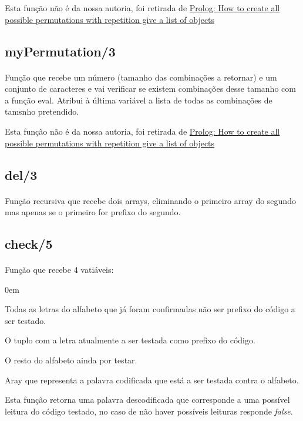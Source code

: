 \documentclass[11pt]{article}
\begin{document}
	Esta função não é da nossa autoria, foi retirada de \href{https://stackoverflow.com/questions/43102965/prolog-how-to-create-all-possible-permutations-with-repetition-give-a-list-of-o}{Prolog: How to create all possible permutations with repetition give a list of objects}
	\subsection{myPermutation/3}
	\paragraph{}
	Função que recebe um número (tamanho das combinações a retornar) e um conjunto de caracteres e vai verificar se existem combinações desse tamanho com a função eval. Atribui à última variável a lista de todas as combinações de tamsnho pretendido.
	
	Esta função não é da nossa autoria, foi retirada de \href{https://stackoverflow.com/questions/43102965/prolog-how-to-create-all-possible-permutations-with-repetition-give-a-list-of-o}{Prolog: How to create all possible permutations with repetition give a list of objects}
	\subsection{del/3}
	\paragraph{}
	Função recursiva que recebe dois arrays, eliminando o primeiro array do segundo mas apenas se o primeiro for prefixo do segundo.
	\newpage
	\subsection{check/5}
	\paragraph{}
	Função que recebe 4 vatiáveis:
	\begin{description}
		\addtolength{\itemindent}{0.80cm}
		\itemsep0em 
		\item[1ª.]Todas as letras do alfabeto que já foram confirmadas não ser prefixo do código a ser testado.
		\item[2ª]O tuplo com a letra atualmente a ser testada como prefixo do código.
		\item[3ª.] O resto do alfabeto ainda por testar.
		\item[4ª.] Aray que representa a palavra codificada que está a ser testada contra o alfabeto.
	\end{description}
	Esta função retorna uma palavra descodificada que corresponde a uma possível leitura do código testado, no caso de não haver possíveis leituras responde \textit{false}.
\end{document}
